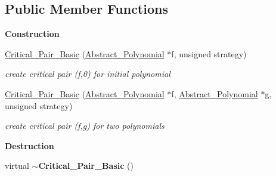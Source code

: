 \subsection*{Public Member Functions}
\begin{Indent}\textbf{ Construction}\par
\begin{DoxyCompactItemize}
\item 
\mbox{\label{class_critical___pair___basic_a31b6d04b646c0910442bb07eb21dbaad}} 
\hyperlink{class_critical___pair___basic_a31b6d04b646c0910442bb07eb21dbaad}{Critical\+\_\+\+Pair\+\_\+\+Basic} (\hyperlink{class_abstract___polynomial}{Abstract\+\_\+\+Polynomial} $\ast$f, unsigned strategy)
\begin{DoxyCompactList}\small\item\em create critical pair (f,0) for initial polynomial \end{DoxyCompactList}\item 
\mbox{\label{class_critical___pair___basic_ac15d26699497686d0b0cfa5b9aa1f7ef}} 
\hyperlink{class_critical___pair___basic_ac15d26699497686d0b0cfa5b9aa1f7ef}{Critical\+\_\+\+Pair\+\_\+\+Basic} (\hyperlink{class_abstract___polynomial}{Abstract\+\_\+\+Polynomial} $\ast$f, \hyperlink{class_abstract___polynomial}{Abstract\+\_\+\+Polynomial} $\ast$g, unsigned strategy)
\begin{DoxyCompactList}\small\item\em create critical pair (f,g) for two polynomials \end{DoxyCompactList}\end{DoxyCompactItemize}
\end{Indent}
\begin{Indent}\textbf{ Destruction}\par
\begin{DoxyCompactItemize}
\item 
\mbox{\label{class_critical___pair___basic_a5a3c9fa67ec45e8f9891d667c1ff43ec}} 
virtual {\bfseries $\sim$\+Critical\+\_\+\+Pair\+\_\+\+Basic} ()
\end{DoxyCompactItemize}
\end{Indent}
